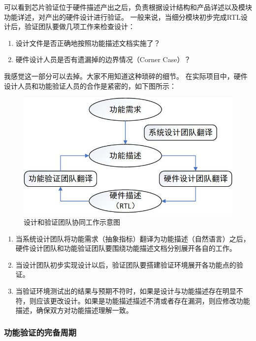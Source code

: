 \begin{center}
可以看到芯片验证位于硬件描述产出之后，负责根据设计结构和产品详述以及模块功能详述，对产出的硬件设计进行验证。
一般来说，当细分模块初步完成RTL设计后，验证团队要做几项工作来检查设计：
\begin{enumerate}
	\item 设计文件是否正确地按照功能描述文档实施了？
	\item 硬件设计人员是否有遗漏掉的边界情况（Corner Case）？
\end{enumerate}

我感觉这一部分可以去掉。大家不用知道这种琐碎的细节。
在实际项目中，硬件设计人员和功能验证人员的合作是紧密的，如下图所示：
\begin{figure}[H] %
\centering %
\includegraphics[width=\textwidth]{Img/设计和验证团队协同工作示意图.jpg} %
\caption{设计和验证团队协同工作示意图} %
\label{设计和验证团队协同工作示意图} %
\end{figure}

\begin{enumerate}
	\item 当系统设计团队将功能需求（抽象指标）翻译为功能描述（自然语言）之后，硬件设计团队和功能验证团队要围绕功能描述文档分别展开各自的工作。
	\item 当设计团队初步实现设计以后，验证团队要搭建验证环境展开各功能点的验证。
	\item 当验证环境测试出的结果与预期不符时，如果是设计与功能描述存在明显不符，则应该更改设计。如果是功能描述描述不清或者存在漏洞，则应修改功能描述，确保双方对功能描述理解一致。
\end{enumerate}

\subsubsection{功能验证的完备周期}


\end{center}
